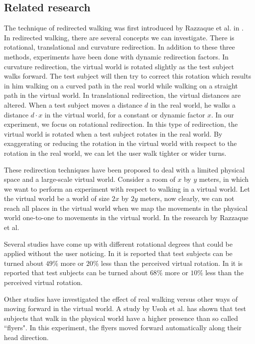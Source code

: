 \subsection{Related  research}
The technique of redirected walking was first introduced by Razzaque et al. in \cite{razzaque}. 
In redirected walking, there are several concepts we can investigate.
There is rotational, translational and curvature redirection.
In addition to these three methods, experiments have been done with dynamic redirection factors.\cite{neth}
In curvature redirection, the virtual world is rotated slightly as the test subject walks forward.
The test subject will then try to correct this rotation which results in him walking on a curved path in the real world while walking on a straight path in the virtual world.
In translational redirection, the virtual distances are altered.
When a test subject moves a distance $d$ in the real world, he walks a distance $d\cdot x$ in the virtual world, for a constant or dynamic factor $x$.
In our experiment, we focus on rotational redirection.
In this type of redirection, the virtual world is rotated when a test subject rotates in the real world.
By exaggerating or reducing the rotation in the virtual world with respect to the rotation in the real world, we can let the user walk tighter or wider turns.

These redirection techniques have been proposed to deal with a limited physical space and a large-scale virtual world.
Consider a room of $x$ by $y$ meters, in which we want to perform an experiment with respect to walking in a virtual world. 
Let the virtual world be a world of size $2x$ by $2y$ meters, now clearly, we can not reach all places in the virtual world when we map the movements in the physical world one-to-one to movements in the virtual world.
In the research by Razzaque et al. \cite{razzaque} 

Several studies \cite{steinicke2}\cite{steinicke1} have come up with different rotational degrees that could be applied without the user noticing.
In \cite{steinicke2} it is reported that test subjects can be turned about $49\%$ more or $20\%$ less than the perceived virtual rotation. 
In \cite{steinicke1} it is reported that test subjects can be turned about $68\%$ more or $10\%$ less than the perceived virtual rotation. 

Other studies have investigated the effect of real walking versus other ways of moving forward in the virtual world.
A study by Usoh et al. \cite{usoh} has shown that test subjects that walk in the physical world have a higher presence than so called ``flyers".
In this experiment, the flyers moved forward automatically along their head direction.


